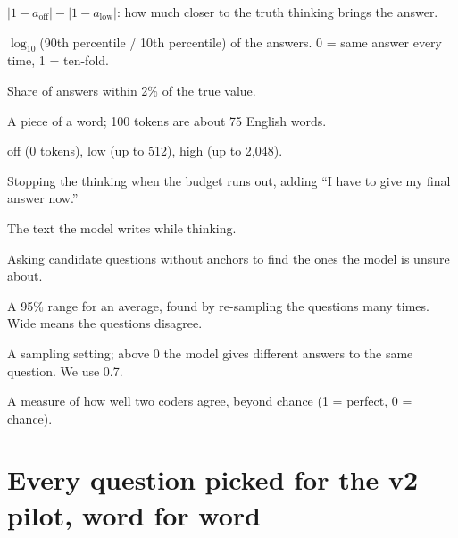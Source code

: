 \documentclass[11pt,a4paper]{article}
\begin{document}
\begin{description}[style=nextline,leftmargin=0.5cm,itemsep=3pt]
  \item[Thinking gain] $|1-a_{\text{off}}| - |1-a_{\text{low}}|$: how much closer to the truth thinking brings the answer.
  \item[Spread] $\log_{10}$(90th percentile / 10th percentile) of the answers. 0 = same answer every time, 1 = ten-fold.
  \item[Known] Share of answers within 2\% of the true value.
  \item[Token] A piece of a word; 100 tokens are about 75 English words.
  \item[Thinking level] off (0 tokens), low (up to 512), high (up to 2,048).
  \item[Budget forcing] Stopping the thinking when the budget runs out, adding ``I have to give my final answer now.''
  \item[Trace] The text the model writes while thinking.
  \item[Screening] Asking candidate questions without anchors to find the ones the model is unsure about.
  \item[Bootstrap interval] A 95\% range for an average, found by re-sampling the questions many times. Wide means the questions disagree.
  \item[Temperature] A sampling setting; above 0 the model gives different answers to the same question. We use 0.7.
  \item[Cohen's kappa] A measure of how well two coders agree, beyond chance (1 = perfect, 0 = chance).
\end{description}

\section{Every question picked for the v2 pilot, word for word}
\label{app:questions}
\end{document}
